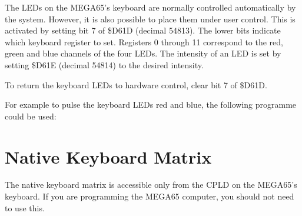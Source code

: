 The LEDs on the MEGA65's keyboard are normally controlled automatically
by the system.  However, it is also possible to place them under
user control.  This is activated by setting bit 7 of \$D61D (decimal 54813).
The lower bits indicate which keyboard register to set.  Registers 0 through 11
correspond to the red, green and blue channels of the four LEDs.  The intensity
of an LED is set by setting \$D61E (decimal 54814) to the desired intensity.

To return the keyboard LEDs to hardware control, clear bit 7 of \$D61D.

For example to pulse the keyboard LEDs red and blue, the following programme
could be used:



\section{Native Keyboard Matrix}

The native keyboard matrix is accessible only from the CPLD on the MEGA65's keyboard.
If you are programming the MEGA65 computer, you should not need to use this.


